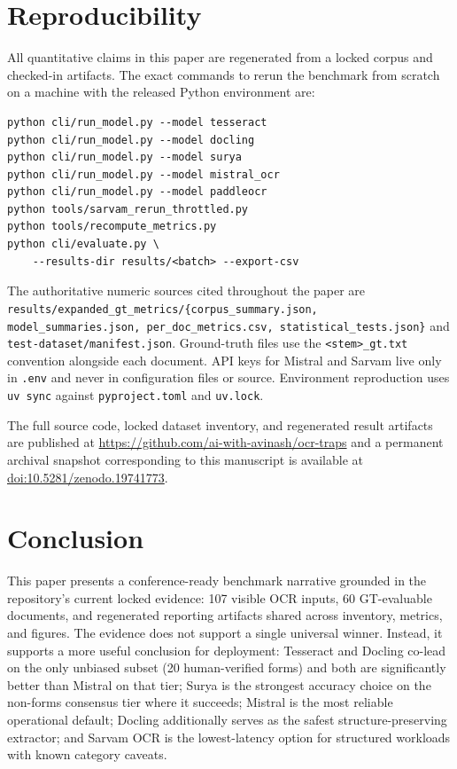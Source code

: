 \documentclass[conference]{IEEEtran}
\begin{document}
\section{Reproducibility}

All quantitative claims in this paper are regenerated from a locked corpus and checked-in artifacts. The exact commands to rerun the benchmark from scratch on a machine with the released Python environment are:

\begin{verbatim}
python cli/run_model.py --model tesseract
python cli/run_model.py --model docling
python cli/run_model.py --model surya
python cli/run_model.py --model mistral_ocr
python cli/run_model.py --model paddleocr
python tools/sarvam_rerun_throttled.py
python tools/recompute_metrics.py
python cli/evaluate.py \
    --results-dir results/<batch> --export-csv
\end{verbatim}

The authoritative numeric sources cited throughout the paper are \texttt{results/expanded\_gt\_metrics/\{corpus\_summary.json, model\_summaries.json, per\_doc\_metrics.csv, statistical\_tests.json\}} and \texttt{test-dataset/manifest.json}. Ground-truth files use the \texttt{<stem>\_gt.txt} convention alongside each document. API keys for Mistral and Sarvam live only in \texttt{.env} and never in configuration files or source. Environment reproduction uses \texttt{uv sync} against \texttt{pyproject.toml} and \texttt{uv.lock}.

The full source code, locked dataset inventory, and regenerated result artifacts are published at \url{https://github.com/ai-with-avinash/ocr-traps} and a permanent archival snapshot corresponding to this manuscript is available at \href{https://doi.org/10.5281/zenodo.19741773}{doi:10.5281/zenodo.19741773}.

\section{Conclusion}

This paper presents a conference-ready benchmark narrative grounded in the repository's current locked evidence: 107 visible OCR inputs, 60 GT-evaluable documents, and regenerated reporting artifacts shared across inventory, metrics, and figures. The evidence does not support a single universal winner. Instead, it supports a more useful conclusion for deployment: Tesseract and Docling co-lead on the only unbiased subset (20 human-verified forms) and both are significantly better than Mistral on that tier; Surya is the strongest accuracy choice on the non-forms consensus tier where it succeeds; Mistral is the most reliable operational default; Docling additionally serves as the safest structure-preserving extractor; and Sarvam OCR is the lowest-latency option for structured workloads with known category caveats.
\end{document}
